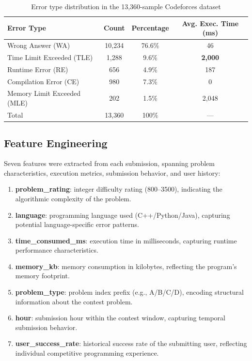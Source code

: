 \documentclass[acmsmall]{acmart}
\begin{document}
\begin{table}[htbp]
\centering
\caption{Error type distribution in the 13,360-sample Codeforces dataset}
\label{tab:error-dist}
\begin{tabular}{@{}lccc@{}}
\toprule
Error Type & Count & Percentage & Avg. Exec. Time (ms) \\
\midrule
Wrong Answer (WA) & 10,234 & 76.6\% & 46 \\
Time Limit Exceeded (TLE) & 1,288 & 9.6\% & \textbf{2,000} \\
Runtime Error (RE) & 656 & 4.9\% & 187 \\
Compilation Error (CE) & 980 & 7.3\% & 0 \\
Memory Limit Exceeded (MLE) & 202 & 1.5\% & 2,048 \\
\midrule
Total & 13,360 & 100\% & --- \\
\bottomrule
\end{tabular}
\end{table}

\subsection{Feature Engineering}

Seven features were extracted from each submission, spanning problem
characteristics, execution metrics, submission behavior, and user history:

\begin{enumerate}
 \item \textbf{problem\_rating}: integer difficulty rating (800--3500),
 indicating the algorithmic complexity of the problem.
 \item \textbf{language}: programming language used (C++/Python/Java),
 capturing potential language-specific error patterns.
 \item \textbf{time\_consumed\_ms}: execution time in milliseconds,
 capturing runtime performance characteristics.
 \item \textbf{memory\_kb}: memory consumption in kilobytes, reflecting
 the program's memory footprint.
 \item \textbf{problem\_type}: problem index prefix (e.g., A/B/C/D), encoding
 structural information about the contest problem.
 \item \textbf{hour}: submission hour within the contest window, capturing
 temporal submission behavior.
 \item \textbf{user\_success\_rate}: historical success rate of the submitting
 user, reflecting individual competitive programming experience.
\end{enumerate}
\end{document}
